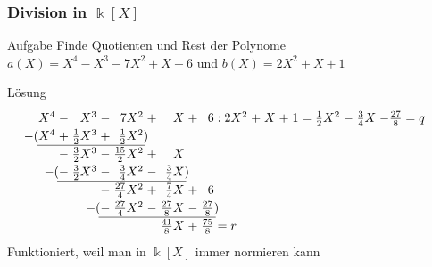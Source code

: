 %
%
%
\begin{frame}[t]
\frametitle{Division in $\Bbbk[X]$}
\vspace{-5pt}
\begin{block}{Aufgabe}
Finde Quotienten und Rest der Polynome
$a(X) = X^4-X^3-7X^2+X+6$
und
$b(X) = 2X^2+X+1$
\end{block}
\begin{block}{Lösung}
\[
\arraycolsep=1.4pt
\renewcommand{\arraystretch}{1.2}
\begin{array}{rcrcrcrcrcrcrcrcrcrcr}
X^4&-&       X^3&-&         7X^2&+&          X&+&           6&:&2X^2&+&X&+&1&=&\frac12X^2&-&\frac34X&-\frac{27}{8} = q\\
\llap{$-($}X^4&+&\frac12X^3&+&   \frac12X^2\rlap{$)$}& &           & &            & &    & & & & & &          & &        &             \\ \cline{1-5}
   &-&\frac32X^3&-&\frac{15}2X^2&+&          X& &            & &    & & & & & &          & &        &             \\
   &\llap{$-($}-&\frac32X^3&-&\frac{ 3}4X^2&-&\frac{ 3}4X\rlap{$)$}& &            & &    & & & & & &          & &        &             \\\cline{2-7}
   & &          &-&\frac{27}4X^2&+&\frac{ 7}4X&+&           6& &    & & & & & &          & &        &             \\
   & &          &\llap{$-($}-&\frac{27}4X^2&-&\frac{27}8X&-&\frac{27}{8}\rlap{$)$}& &    & & & & & &          & &        &             \\\cline{4-9}
   & &          & &             & &\frac{41}8X&+&\frac{75}{8}\rlap{$\mathstrut=r$}& &    & & & & & &          & &        &             \\
\end{array}
\]
Funktioniert, weil man in $\Bbbk[X]$ immer normieren kann
\end{block}

\end{frame}
